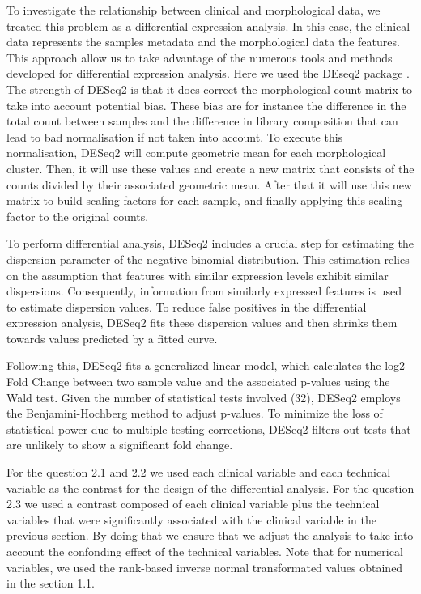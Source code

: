 \documentclass[a4paper, 11pt]{article}
\begin{document}
\begin{multicols}{2}
To investigate the relationship between clinical and morphological data, we treated this problem as a differential expression analysis. 
In this case, the clinical data represents the samples metadata and the morphological data the features. 
This approach allow us to take advantage of the numerous tools and methods developed for differential expression analysis.
Here we used the DEseq2 package \citep{DESeq2:2014}. The strength of DESeq2 is that it does correct the morphological count matrix to take into account potential bias. 
These bias are for instance the difference in the total count between samples and the difference in library composition that can lead to bad normalisation if not taken into account. 
To execute this normalisation, DESeq2 will compute geometric mean for each morphological cluster. 
Then, it will use these values and create a new matrix that consists of the counts divided by their associated geometric mean. 
After that it will use this new matrix to build scaling factors for each sample, and finally applying this scaling factor to the original counts.

To perform differential analysis, DESeq2 includes a crucial step for estimating the dispersion parameter of the negative-binomial distribution. 
This estimation relies on the assumption that features with similar expression levels exhibit similar dispersions. 
Consequently, information from similarly expressed features is used to estimate dispersion values. 
To reduce false positives in the differential expression analysis, DESeq2 fits these dispersion values and then shrinks them towards values predicted by a fitted curve. 

Following this, DESeq2 fits a generalized linear model, which calculates the log2 Fold Change between two sample value and the associated p-values using the Wald test. 
Given the number of statistical tests involved (32), DESeq2 employs the Benjamini-Hochberg method to adjust p-values. 
To minimize the loss of statistical power due to multiple testing corrections, DESeq2 filters out tests that are unlikely to show a significant fold change.

For the question 2.1 and 2.2 we used each clinical variable and each technical variable as the contrast for the design of the differential analysis.
For the question 2.3 we used a contrast composed of each clinical variable plus the technical variables that were significantly associated with the clinical variable in the previous section.
By doing that we ensure that we adjust the analysis to take into account the confonding effect of the technical variables.
Note that for numerical variables, we used the rank-based inverse normal transformated values obtained in the section 1.1.


\end{multicols}
\end{document}
